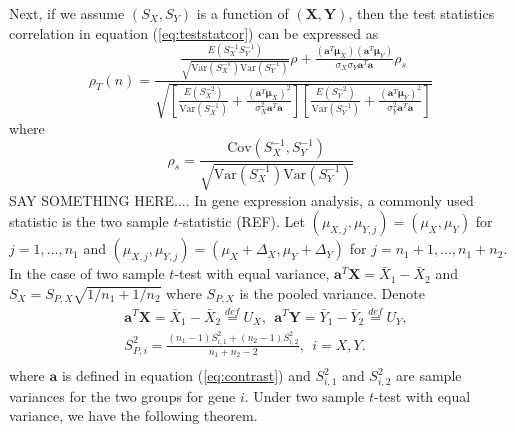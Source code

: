 \documentclass[12pt, a4paper]{article}
\newcommand{\cov}{\text{Cov}}
\newcommand{\var}{\text{Var}}
\begin{document}
	Next, if we assume $(S_X, S_Y)$ is a function of $(\bm X, \bm Y)$, then the test statistics correlation in equation (\ref{eq:teststatcor}) can be expressed as  
	\begin{equation}
		\rho_T(n) = \frac{ \frac{E(S_X^{-1}S_Y^{-1})}
			{\sqrt{\var(S_X^{-1})\var(S_Y^{-1})}}\rho + \frac{(\bm a^T\bm \mu_X)(\bm a^T\bm \mu_Y)}{\sigma_X\sigma_Y\bm a^T\bm a} \rho_s	
		}{\sqrt{\left[ \frac{E(S_X^{-2})}{\var(S_X^{-1})} + \frac{(\bm a^T\bm \mu_X)^2}{\sigma_X^2\bm a^T\bm a}\right]\left[ \frac{E(S_Y^{-2})}{\var(S_Y^{-1})} + \frac{(\bm a^T\bm \mu_Y)^2}{\sigma_Y^2\bm a^T\bm a}\right]}} 
	\end{equation}
	where 
	\begin{equation}
	 \rho_s = \frac{\cov(S_X^{-1},S_Y^{-1})}{\sqrt{\var(S_X^{-1})\var(S_Y^{-1})}}
	\end{equation}
	SAY SOMETHING HERE....
	\newpage
	In gene expression analysis, a commonly used statistic is the two sample $t$-statistic (REF). Let $(\mu_{X,j}, \mu_{Y, j}) = (\mu_X, \mu_Y)$ 
	for $j = 1, \ldots, n_1$ and $(\mu_{X,j}, \mu_{Y, j}) = (\mu_X + \Delta_X, \mu_Y + \Delta_Y)$ for $j = n_1 + 1, \ldots, n_1 + n_2$. In the 
	case of two sample $t$-test with equal variance, $\bm a^T\bm X = \bar{X}_1 - \bar{X}_2$ and $S_X = S_{P, X}\sqrt{1/n_1 + 1/n_2}$ where 
	$S_{P,X}$ is the pooled variance. Denote  
	 \begin{equation}\label{eq:tstatform}
	 \begin{aligned}
	 &\bm a^T\bm X  = \bar{X}_1 - \bar{X}_2 \stackrel{def}{= }U_X, ~~\bm a^T\bm Y = \bar{Y}_1 -\bar{Y}_2 \stackrel{def}{=}U_Y, \\
	 &S_{P, i}^2 = \frac{(n_1-1)S_{i, 1}^2 + (n_2 -1)S_{i,2}^2}{n_1 + n_2 -2}, ~~i = X, Y. \\
	 \end{aligned}
	 \end{equation}
	where $\bm a$ is defined in equation (\ref{eq:contrast}) and $S_{i, 1}^2$ and $S_{i, 2}^2$ are sample variances for the two groups for gene $i$. Under two sample $t$-test with equal variance, we have the following theorem.
\end{document}
